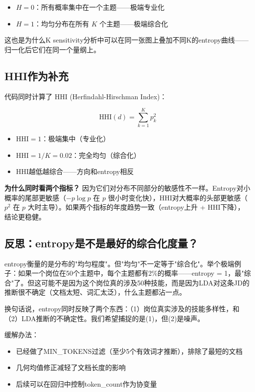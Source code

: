 \documentclass[12pt,a4paper]{ctexart}
\begin{document}
\begin{itemize}
\item $H = 0$：所有概率集中在一个主题——极端专业化
\item $H = 1$：均匀分布在所有 $K$ 个主题——极端综合化
\end{itemize}

这也是为什么K sensitivity分析中可以在同一张图上叠加不同K的entropy曲线——归一化后它们在同一个量纲上。

\subsection{HHI作为补充}

代码同时计算了 HHI (Herfindahl-Hirschman Index)：

\begin{equation}
\text{HHI}(d) = \sum_{k=1}^{K} p_k^2
\end{equation}

\begin{itemize}
\item $\text{HHI} = 1$：极端集中（专业化）
\item $\text{HHI} = 1/K = 0.02$：完全均匀（综合化）
\item HHI越低越综合——方向和entropy相反
\end{itemize}

\textbf{为什么同时看两个指标？} 因为它们对分布不同部分的敏感性不一样。Entropy对小概率的尾部更敏感（$-p\log p$ 在 $p$ 很小时变化快），HHI对大概率的头部更敏感（$p^2$ 在 $p$ 大时主导）。如果两个指标的年度趋势一致（entropy上升 + HHI下降），结论更稳健。

\subsection{反思：entropy是不是最好的综合化度量？}

entropy衡量的是分布的"均匀程度"。但"均匀"不一定等于"综合化"。举个极端例子：如果一个岗位在50个主题中，每个主题都有2\%的概率——entropy = 1，最"综合"了。但这可能不是因为这个岗位真的涉及50种技能，而是因为LDA对这条JD的推断很不确定（文档太短、词汇太泛），什么主题都沾一点。

换句话说，entropy同时反映了两个东西：（1）岗位真实涉及的技能多样性，和（2）LDA推断的不确定性。我们希望捕捉的是(1)，但(2)是噪声。

缓解办法：
\begin{itemize}
\item 已经做了MIN\_TOKENS过滤（至少5个有效词才推断），排除了最短的文档
\item 几何均值修正减轻了文档长度的影响
\item 后续可以在回归中控制token\_count作为协变量
\end{itemize}
\end{document}
